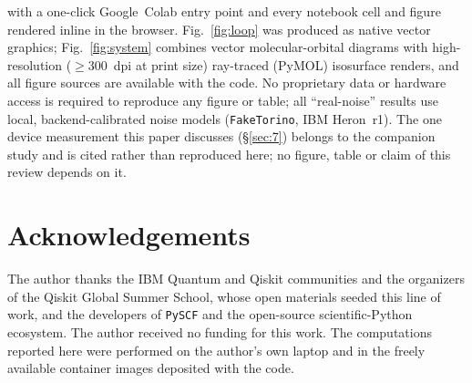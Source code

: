 \documentclass[onecolumn,a4paper]{quantumarticle}
\begin{document}
with a one-click Google~Colab entry point and every notebook cell and figure rendered inline in the browser.
Fig.~\ref{fig:loop} was produced as native vector graphics; Fig.~\ref{fig:system} combines vector molecular-orbital diagrams with high-resolution ($\ge$300~dpi at print size) ray-traced (PyMOL) isosurface renders, and all figure sources are available with the code. No proprietary data or
hardware access is required to reproduce any figure or table; all ``real-noise'' results use local,
backend-calibrated noise models (\texttt{FakeTorino}, IBM Heron~r1). The one device measurement
this paper discusses (\S\ref{sec:7}) belongs to the companion study \cite{bonilla2026spectral} and is
cited rather than reproduced here; no figure, table or claim of this review depends on it.

\section*{Acknowledgements}
\small
The author thanks the IBM Quantum and Qiskit communities and the organizers of the Qiskit Global Summer School,
whose open materials seeded this line of work, and the developers of \texttt{PySCF} and the
open-source scientific-Python ecosystem.
The author received no funding for this work. The computations reported here were performed on the author's own laptop and in the freely available container images deposited with the code.
\end{document}
